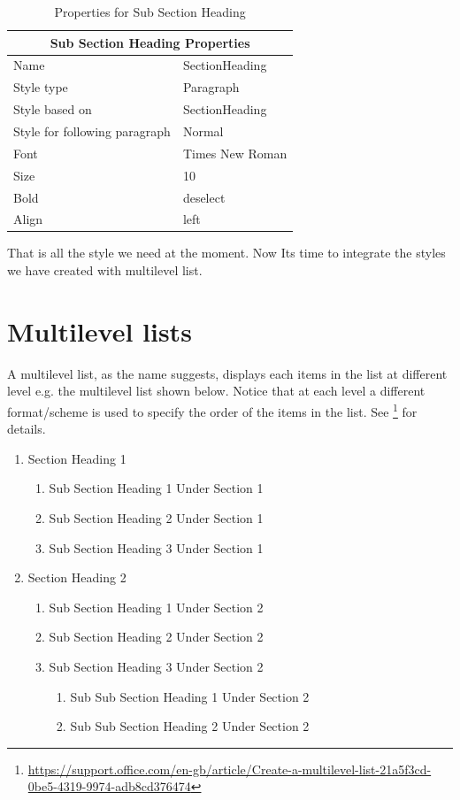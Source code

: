 \begin{table}
     \centering
     \begin{tabular}{l | l}
         \toprule
          \multicolumn{2}{c}{Sub Section Heading Properties} \\ \toprule
          Name & SectionHeading \\
          Style type & Paragraph \\
          Style based on & SectionHeading \\
          Style for following paragraph & Normal \\
          Font & Times New Roman \\
          Size & 10 \\
          Bold & deselect \\
          Align & left \\ \bottomrule
     \end{tabular}
     \caption{Properties for Sub Section Heading}
     \label{tab:subsectionheading}
 \end{table}
 That is all the style we need at the moment. Now Its time to integrate the styles we have created with multilevel list.
 
 \section{Multilevel lists}
 A multilevel list, as the name suggests, displays each items in the list at different level e.g. the multilevel list shown below. Notice that at each level a different format/scheme is used to specify the order of the items in the list. See \footnote{\url{https://support.office.com/en-gb/article/Create-a-multilevel-list-21a5f3cd-0be5-4319-9974-adb8cd376474}} for details.
 \begin{enumerate}
     \item Section Heading 1
         \begin{enumerate}
         \item Sub Section Heading 1 Under Section 1
         \item Sub Section Heading 2 Under Section 1
         \item Sub Section Heading 3 Under Section 1
         \end{enumerate}
     \item Section Heading 2
        \begin{enumerate}
        \item Sub Section Heading 1 Under Section 2
        \item Sub Section Heading 2 Under Section 2
        \item Sub Section Heading 3 Under Section 2
            \begin{enumerate}
            \item Sub Sub Section Heading 1 Under Section 2
            \item Sub Sub Section Heading 2 Under Section 2
            \end{enumerate}
        \end{enumerate}
 \end{enumerate}
